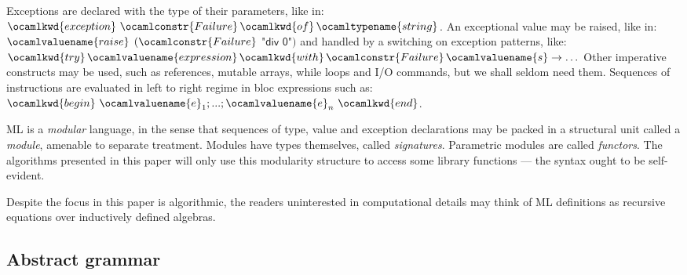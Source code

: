 Exceptions are declared with the type of their parameters, like in:
$\ocamlkwd{exception} \,\, \ocamlconstr{Failure} \, \ocamlkwd{of} \,
\ocamltypename{string}$. An exceptional value may be raised, like in: 
$\ocamlvaluename{raise}$ $(\ocamlconstr{Failure}$ $\textsf{"div
0"})$ and handled by a  switching on exception patterns,
like: $\ocamlkwd{try} \, \ocamlvaluename{expression} \,
\ocamlkwd{with} \, \ocamlconstr{Failure} \, \ocamlvaluename{s}
\rightarrow \ldots$ Other imperative constructs may be used, such as 
references, mutable arrays, while loops and I/O commands, 
but we shall seldom need them. Sequences of instructions are 
evaluated in left to right regime in bloc expressions such as:
$\ocamlkwd{begin} \,\, {\ocamlvaluename{e}_1; ...;
\ocamlvaluename{e}_n} \,\, \ocamlkwd{end}$. 

ML is a \emph{modular} language, in the sense that sequences of type,
value and exception declarations may be packed in a structural unit
called a \emph{module}, amenable to separate treatment. 
Modules have types themselves, called \emph{signatures}. Parametric 
modules are called \emph{functors}. The algorithms presented in this
paper will only use this modularity structure to access some library
functions --- the syntax ought to be self-evident.

Despite the focus in this paper is algorithmic, the readers
uninterested in computational details may think of ML
definitions as recursive equations over inductively defined
algebras.


\subsection{Abstract grammar}\label{abstract_grammar}

